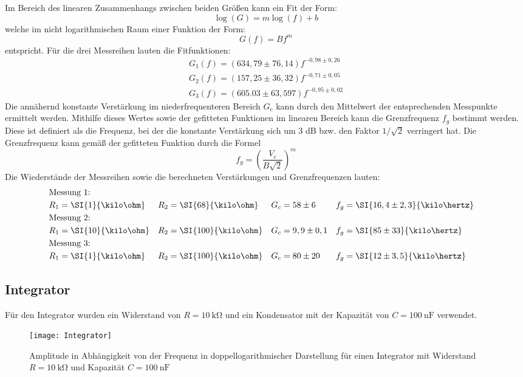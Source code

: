 Im Bereich des linearen Zusammenhangs zwischen beiden Größen kann ein Fit der Form:
\begin{equation}
\log(G)=m\log(f)+b
\end{equation}
welche im nicht logarithmischen Raum einer Funktion der Form:
\begin{equation}
G(f)=Bf^m
\end{equation}
entspricht. Für die drei Messreihen lauten die Fitfunktionen:
\begin{gather}
G_1(f)=(634,79\pm76,14)f^{-0,98\pm0,26} \\
G_2(f)=(157,25\pm36,32)f^{-0,71\pm0,05} \\
G_3(f)=(605.03\pm63,597)f^{-0,95\pm0,02}
\end{gather}
Die annähernd konstante Verstärkung im niederfrequenteren Bereich $G_c$ kann durch den Mittelwert der entsprechenden Messpunkte ermittelt werden. Mithilfe dieses Wertes sowie der gefitteten Funktionen im linearen Bereich kann die Grenzfrequenz $f_g$ bestimmt werden. Diese ist definiert als die Frequenz, bei der die konstante Verstärkung sich um 3 dB bzw. den Faktor $1/\sqrt{2}$ verringert hat. Die Grenzfrequenz kann gemäß der gefitteten Funktion durch die Formel
\begin{equation}
f_g=\left(\frac{V_c}{B\sqrt{2}}\right)^m
\end{equation}
Die Wiederstände der Messreihen sowie die berechneten Verstärkungen und Grenzfrequenzen lauten:
\begin{align*}
    &\text{Messung 1:}\\
    & R_1 = \SI{1}{\kilo\ohm}     &&  R_2 = \SI{68}{\kilo\ohm}     &&  G_c = 58\pm6  && f_g=\SI{16,4\pm2,3}{\kilo\hertz}  \\
    &\text{Messung 2:}\\
   & R_1 = \SI{10}{\kilo\ohm}     &&  R_2 = \SI{100}{\kilo\ohm}     &&  G_c = 9,9\pm0,1  && f_g=\SI{85\pm33}{\kilo\hertz} \\
    &\text{Messung 3:}\\
   & R_1 = \SI{1}{\kilo\ohm}     &&  R_2 = \SI{100}{\kilo\ohm}     &&  G_c = 80\pm20  && f_g=\SI{12\pm3,5}{\kilo\hertz} \\
\end{align*}
\subsection{Integrator}
Für den Integrator wurden ein Widerstand von $R=\SI{10}{\kilo\ohm}$ und ein Kondensator mit der Kapazität von $C=\SI{100}{\nano\farad}$ verwendet.
\begin{figure}
\centering
\texttt{[image: Integrator]}
\caption{Amplitude in Abhängigkeit von der Frequenz in doppellogarithmischer Darstellung für einen Integrator mit Widerstand $R=\SI{10}{\kilo\ohm}$ und Kapazität $C=\SI{100}{\nano\farad}$}
\label{fig:int}
\end{figure}

